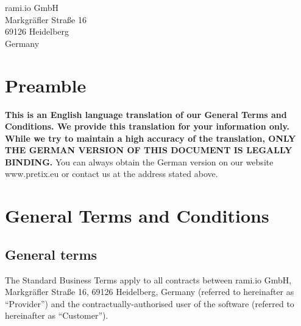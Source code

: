 \documentclass{terms}
\begin{document}
\maketitle

\begin{center}
rami.io GmbH\\
Markgräfler Straße 16\\
69126 Heidelberg\\
Germany
\end{center}
\sloppy

\section*{Preamble}

\textbf{This is an English language translation of our General Terms and Conditions. We provide this translation for your information only. While we try to maintain a high accuracy of the translation, ONLY THE GERMAN VERSION OF THIS DOCUMENT IS LEGALLY BINDING.}
You can always obtain the German version on our website www.pretix.eu or contact us at the address stated above.

\section{General Terms and Conditions}
\subsection{General terms}
The Standard Business Terms apply to all contracts between rami.io GmbH, Markgräfler Straße 16, 69126 Heidelberg, Germany (referred to hereinafter as “Provider”) and the contractually-authorised user of the software (referred to hereinafter as “Customer”).
\end{document}
